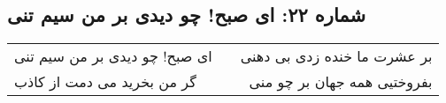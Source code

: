 \begin{center}
\section*{شماره ۲۲: ای صبح! چو دیدی بر من سیم تنی}
\label{sec:022}
\begin{longtable}{l p{0.5cm} r}
ای صبح! چو دیدی بر من سیم تنی
&&
بر عشرت ما خنده زدی بی دهنی
\\
گر من بخرید می دمت از کاذب
&&
بفروختیی همه جهان بر چو منی
\\
\end{longtable}
\end{center}
